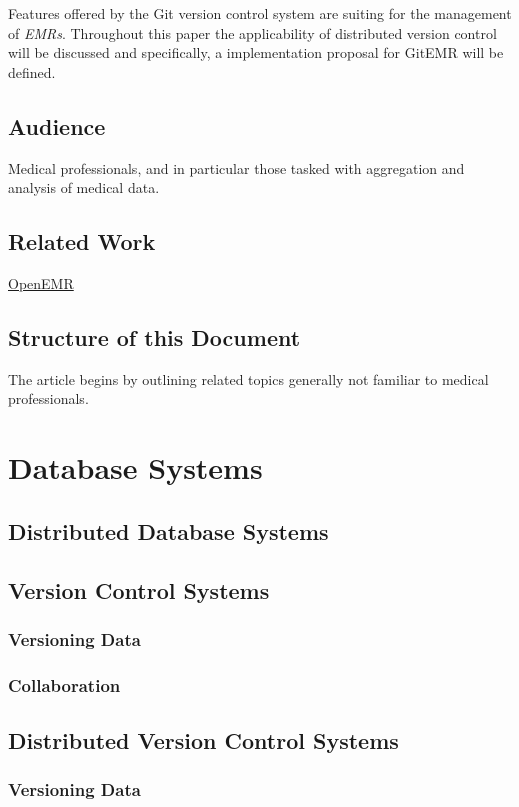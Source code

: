 \documentclass{acm_proc_article-sp}
\begin{document}
Features offered by the Git version control system are suiting for the management of \textit{EMRs}.
Throughout this paper the applicability of distributed version control will be discussed and specifically,
a implementation  proposal for GitEMR will be defined.

\subsection{Audience}
Medical professionals, and in particular those tasked with aggregation and analysis of medical data.

\subsection{Related Work}

\href{http://www.open-emr.org/}{OpenEMR}


\subsection{Structure of this Document}
The article begins by outlining related topics generally not familiar to medical professionals.


\section{Database Systems}

\subsection{Distributed Database Systems}
\subsection{Version Control Systems}
\subsubsection{Versioning Data}
\subsubsection{Collaboration}
\subsection{Distributed Version Control Systems}
\subsubsection{Versioning Data}
\end{document}
